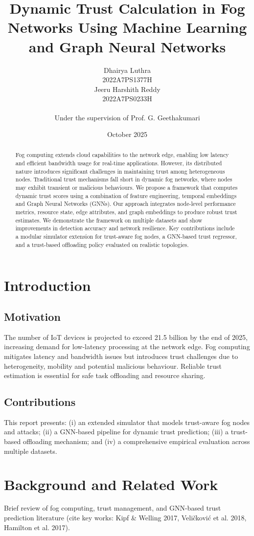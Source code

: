 \documentclass[12pt,a4paper]{article}
\title{Dynamic Trust Calculation in Fog Networks Using Machine Learning and Graph Neural Networks}
\author{Dhairya Luthra \\ 2022A7PS1377H \\ Jeeru Harshith Reddy \\ 2022A7PS0233H \\\\ Under the supervision of Prof. G. Geethakumari}
\date{October 2025}
\begin{document}
\maketitle
\begin{abstract}
Fog computing extends cloud capabilities to the network edge, enabling low latency and efficient bandwidth usage for real-time applications. However, its distributed nature introduces significant challenges in maintaining trust among heterogeneous nodes. Traditional trust mechanisms fall short in dynamic fog networks, where nodes may exhibit transient or malicious behaviours. We propose a framework that computes dynamic trust scores using a combination of feature engineering, temporal embeddings and Graph Neural Networks (GNNs). Our approach integrates node-level performance metrics, resource state, edge attributes, and graph embeddings to produce robust trust estimates. We demonstrate the framework on multiple datasets and show improvements in detection accuracy and network resilience. Key contributions include a modular simulator extension for trust-aware fog nodes, a GNN-based trust regressor, and a trust-based offloading policy evaluated on realistic topologies.
\end{abstract}

\section{Introduction}
\subsection{Motivation}
The number of IoT devices is projected to exceed 21.5 billion by the end of 2025, increasing demand for low-latency processing at the network edge. Fog computing mitigates latency and bandwidth issues but introduces trust challenges due to heterogeneity, mobility and potential malicious behaviour. Reliable trust estimation is essential for safe task offloading and resource sharing.

\subsection{Contributions}
This report presents: (i) an extended simulator that models trust-aware fog nodes and attacks; (ii) a GNN-based pipeline for dynamic trust prediction; (iii) a trust-based offloading mechanism; and (iv) a comprehensive empirical evaluation across multiple datasets.

\section{Background and Related Work}
Brief review of fog computing, trust management, and GNN-based trust prediction literature (cite key works: Kipf \& Welling 2017, Veli\v{c}kovi\'c et al. 2018, Hamilton et al. 2017).
\end{document}
